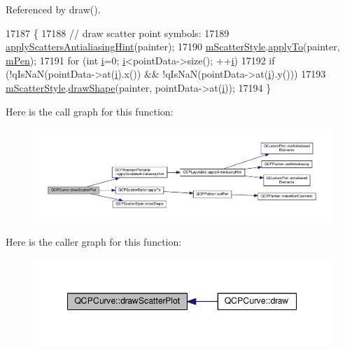 Referenced by draw().


\begin{DoxyCode}
17187 \{
17188   \textcolor{comment}{// draw scatter point symbols:}
17189   \hyperlink{class_q_c_p_abstract_plottable_a753272ee225a62827e90c3e1e78de4b1}{applyScattersAntialiasingHint}(painter);
17190   \hyperlink{class_q_c_p_curve_a08f803b4a30b01bbd7a1eab15d0f864f}{mScatterStyle}.\hyperlink{class_q_c_p_scatter_style_a81817dfd404635f211e6ff2a04657d36}{applyTo}(painter, \hyperlink{class_q_c_p_abstract_plottable_a67bc0622fd1b9fa14e54c14922dcec66}{mPen});
17191   \textcolor{keywordflow}{for} (\textcolor{keywordtype}{int} \hyperlink{_comparision_pictures_2_createtest_image_8m_a6f6ccfcf58b31cb6412107d9d5281426}{i}=0; \hyperlink{_comparision_pictures_2_createtest_image_8m_a6f6ccfcf58b31cb6412107d9d5281426}{i}<pointData->size(); ++\hyperlink{_comparision_pictures_2_createtest_image_8m_a6f6ccfcf58b31cb6412107d9d5281426}{i})
17192     \textcolor{keywordflow}{if} (!qIsNaN(pointData->at(\hyperlink{_comparision_pictures_2_createtest_image_8m_a6f6ccfcf58b31cb6412107d9d5281426}{i}).x()) && !qIsNaN(pointData->at(\hyperlink{_comparision_pictures_2_createtest_image_8m_a6f6ccfcf58b31cb6412107d9d5281426}{i}).y()))
17193       \hyperlink{class_q_c_p_curve_a08f803b4a30b01bbd7a1eab15d0f864f}{mScatterStyle}.\hyperlink{class_q_c_p_scatter_style_a992d531ac471ec2b29bdec6aeb400a06}{drawShape}(painter,  pointData->at(\hyperlink{_comparision_pictures_2_createtest_image_8m_a6f6ccfcf58b31cb6412107d9d5281426}{i}));
17194 \}
\end{DoxyCode}


Here is the call graph for this function\+:\nopagebreak
\begin{figure}[H]
\begin{center}
\leavevmode
\includegraphics[width=350pt]{class_q_c_p_curve_a45593f30b81beec4b6130b6b53306087_cgraph}
\end{center}
\end{figure}




Here is the caller graph for this function\+:\nopagebreak
\begin{figure}[H]
\begin{center}
\leavevmode
\includegraphics[width=348pt]{class_q_c_p_curve_a45593f30b81beec4b6130b6b53306087_icgraph}
\end{center}
\end{figure}


